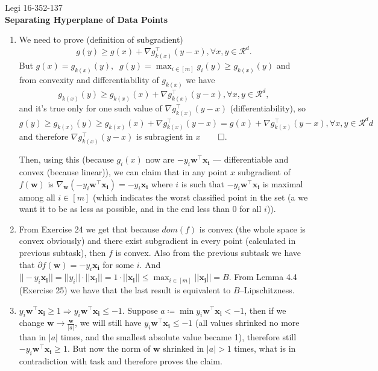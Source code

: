 \documentclass[]{article}
\title{}
\author{}
\begin{document}
Legi 16-352-137\\ 
\textbf{Separating Hyperplane of Data Points}
\begin{enumerate}
	\item We need to prove (definition of subgradient)
	$$g(y) \ge g(x) + \nabla g_{k(x)}^\top(y-x), \forall x,y\in \mathcal{R}^d.$$
	But $g(x) = g_{k(x)}(y),\;\; g(y) = \max_{i\in[m]}g_i(y) \ge g_{k(x)}(y)$ and from convexity and differentiability of $g_{k(x)}$ we have 
	$$g_{k(x)}(y) \ge g_{k(x)}(x) + \nabla g_{k(x)}^\top(y-x), \forall x,y\in \mathcal{R}^d,$$ and it's true only for one such value of $\nabla g_{k(x)}^\top(y-x)$ (differentiability), so
	$$g(y)\ge g_{k(x)}(y) \ge g_{k(x)}(x) + \nabla g_{k(x)}^\top(y-x)=g(x) + \nabla g_{k(x)}^\top(y-x), \forall x,y\in \mathcal{R}^dd$$ and therefore $\nabla g_{k(x)}^\top(y-x)$ is subragient in $x$$\qed$.
	
	Then, using this (because $g_i(x)$ now are $-y_i\mathbf{w}^\top\mathbf{x_i}$ --- differentiable and convex (because linear)), we can claim that in any point $x$ subgradient of $f(\mathbf{w})$ is $\nabla_{\mathbf{w}}(-y_i\mathbf{w}^\top\mathbf{x_i})=-y_i\mathbf{x_i}$ where $i$ is such that $-y_i\mathbf{w}^\top\mathbf{x_i}$ is maximal among all $i\in [m]$ (which indicates the worst classified point in the set (a we want it to be as less as possible, and in the end less than $0$ for all $i$)).
	\item From Exercise 24 we get that because $dom(f)$ is convex (the whole space is convex obviously) and there exist subgradient in every point (calculated in previous subtask), then $f$ is convex. Also from the previous subtask we have that 
	$\partial f(\mathbf{w}) = -y_i\mathbf{x_i}$ for some $i$. And $||-y_i\mathbf{x_i}|| = ||y_i||\cdot||\mathbf{x_i}||=1\cdot||\mathbf{x_i}||\le\max_{i\in [m]}||\mathbf{x_i}|| = B$.
	From Lemma 4.4 (Exercise 25) we have that the last result is equivalent to $B$--Lipschitzness.
	\item $y_i\mathbf{w}^\top\mathbf{x_i}\ge 1 \Rightarrow y_i\mathbf{w}^\top\mathbf{x_i}\le -1$. Suppose $a \coloneqq \min y_i\mathbf{w}^\top\mathbf{x_i} < -1$, then if we change $\mathbf{w}\rightarrow\frac{\mathbf{w}}{|a|}$, we will still have $y_i\mathbf{w}^\top\mathbf{x_i} \le -1$ (all values shrinked no more than in $|a|$ times, and the smallest absolute value became 1), therefore still $-y_i\mathbf{w}^\top\mathbf{x_i} \ge 1$. But now the norm of $\mathbf{w}$ shrinked in $|a|>1$ times, what is in contradiction with task and therefore proves the claim.
	

\end{enumerate}
\end{document}
